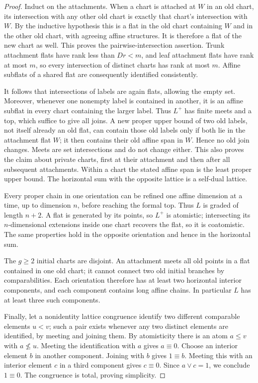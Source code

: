 \begin{proof}
Induct on the attachments. When a chart is attached at $W$ in an old chart,
its intersection with any other old chart is exactly that chart's
intersection with $W$. By the inductive hypothesis this is a flat in the
old chart containing $W$ and in the other old chart, with agreeing affine
structures. It is therefore a flat of the new chart as well. This proves
the pairwise-intersection assertion. Trunk attachment flats have rank less
than $Dr<m$, and leaf attachment flats have rank at most $m$, so every
intersection of distinct charts has rank at most $m$. Affine subflats of a
shared flat are consequently identified consistently.

It follows that intersections of labels are again flats, allowing the
empty set. Moreover, whenever one nonempty label is contained in another,
it is an affine subflat in every chart containing the larger label. Thus
$L^+$ has finite meets and a top, which suffice to give all joins. A new
proper upper bound of two old labels, not itself already an old flat, can
contain those old labels only if both lie in the attachment flat $W$; it
then contains their old affine span in $W$. Hence no old join changes.
Meets are set intersections and do not change either. This also proves
the claim about private charts, first at their attachment and then after
all subsequent attachments. Within a chart the stated affine span is the
least proper upper bound. The horizontal sum with the opposite lattice
is a self-dual lattice.

Every proper chain in one orientation can be refined one affine dimension
at a time, up to dimension $n$, before reaching the formal top. Thus $L$
is graded of length $n+2$. A flat is generated by its points, so $L^+$ is
atomistic; intersecting its $n$-dimensional extensions inside one chart
recovers the flat, so it is coatomistic. The same properties hold in the
opposite orientation and hence in the horizontal sum.

The $g\ge2$ initial charts are disjoint. An attachment meets all old points
in a flat contained in one old chart; it cannot connect two old initial
branches by comparabilities. Each orientation therefore has at least two
horizontal interior components, and each component contains long affine
chains. In particular $L$ has at least three such components.

Finally, let a nonidentity lattice congruence identify two different
comparable elements $u<v$; such a pair exists whenever any two distinct
elements are identified, by meeting and joining them. By atomisticity there
is an atom $a\le v$ with $a\not\le u$. Meeting the identification with $a$
gives $a\equiv0$. Choose an interior element $b$ in another component.
Joining with $b$ gives $1\equiv b$. Meeting this with an interior element $c$
in a third component gives $c\equiv0$. Since $a\vee c=1$, we conclude
$1\equiv0$. The congruence is total, proving simplicity.
\end{proof}

